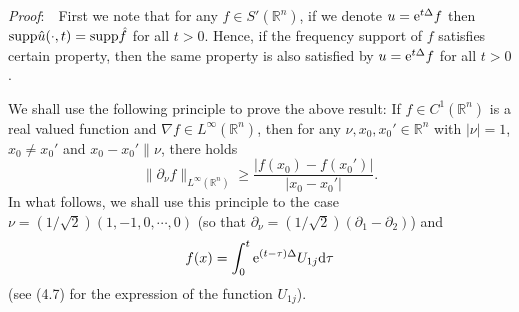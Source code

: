 \documentclass[11pt]{article}
\newcommand{\supp}{{\rm supp}}
\newcommand{\rmd}{\mbox{\rm d}}
\newcommand{\rme}{{\rm e}}
\begin{document}
  {\em Proof}:\ \ First we note that for any $f\in S'(\mathbb{R}^n)$, if we denote $u=\rme^{t\Delta}f$ then $\supp\hat{u}(\cdot,t)=
  \supp\hat{f}$ for all $t>0$. Hence, if the frequency support of $f$ satisfies certain property, then the same property is also
  satisfied by $u=\rme^{t\Delta}f$ for all $t>0$.

  We shall use the following principle to prove the above result: If $f\in C^1(\mathbb{R}^n)$ is a real valued function and
  $\nabla f\in L^{\infty}(\mathbb{R}^n)$, then for any $\nu,x_0,x_0'\in\mathbb{R}^n$ with $|\nu|=1$, $x_0\neq x_0'$ and
  $x_0-x_0'\parallel\nu$, there holds
$$
  \|\partial_{\nu}f\|_{L^{\infty}(\mathbb{R}^n)}\geqslant\frac{|f(x_0)-f(x_0')|}{|x_0-x_0'|}.
$$
  In what follows, we shall use this principle to the case $\nu=(1/\sqrt{2})(1,-1,0,\cdots,0)$ (so that $\partial_{\nu}
  =(1/\sqrt{2})(\partial_1-\partial_2)$) and
\begin{equation}
  f(x)=\int_0^t\rme^{(t-\tau)\Delta}U_{1j}\rmd\tau
\end{equation}
  (see (4.7) for the expression of the function $U_{1j}$).
\end{document}

